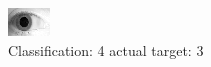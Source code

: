 \begin{figure}[h!]
\begin{center}
\includegraphics[width=0.60\columnwidth]{figures/ID1960_class_4_target_3.png}
\end{center}
\caption{ Classification: 4 actual target: 3}
\label{fig:ID1960_class_4_target_3}
\end{figure}

